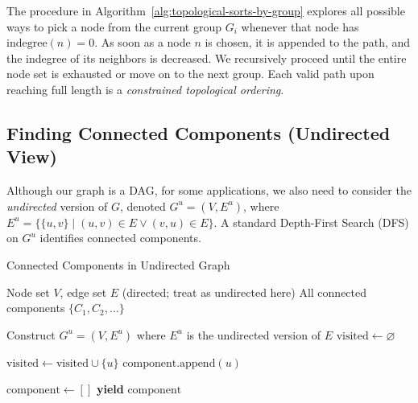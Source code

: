 The procedure in Algorithm~\ref{alg:topological-sorts-by-group} 
explores all possible ways to pick a node from the current group $G_i$ whenever that node has $\text{indegree}(n) = 0$. As soon as a node $n$ is chosen, it is appended to the path, and the indegree of its neighbors is decreased. We recursively proceed until the entire node set is exhausted or move on to the next group. Each valid path upon reaching full length is a \emph{constrained topological ordering}.

\subsection{Finding Connected Components (Undirected View)}
Although our graph is a DAG, for some applications, we also need to consider the \emph{undirected} version of $G$, denoted $G^{u} = (V, E^{u})$, where $E^{u} = \{\{u,v\} \mid (u,v)\in E \lor (v,u)\in E\}$. A standard Depth-First Search (DFS) on $G^{u}$ identifies connected components.
\begin{algorithm}[H]
\caption{Connected Components in Undirected Graph}
\label{alg:connected-components}
\begin{algorithmic}[1]
\Require Node set $V$, edge set $E$ (directed; treat as undirected here)
\Ensure All connected components $\{C_1, C_2, \ldots\}$

\State Construct $G^{u} = (V, E^{u})$ where $E^{u}$ is the undirected version of $E$
\State $\text{visited} \gets \varnothing$

    \State $\text{visited} \gets \text{visited} \cup \{u\}$
    \State $\text{component}.\text{append}(u)$
            \State {}
        \EndIf
    \EndFor
\EndFunction

        \State $\text{component} \gets []$
        \State {}
        \State \textbf{yield} $\text{component}$
    \EndIf
\EndFor
\end{algorithmic}
\end{algorithm}


